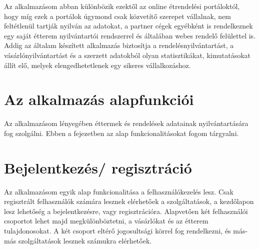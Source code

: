 Az alkalmazásom abban különbözik ezektől az online étrendelési portáloktól, hogy míg ezek a portálok úgymond csak közvetítő szerepet vállalnak, nem feltétlenül tartják nyilván az adatokat, a partner cégek egyébként is rendelkeznek egy saját étterem nyilvántartói rendszerrel és általában webes rendelő felülettel is. Addig az általam készített alkalmazás biztosítja a rendelésnyilvántartást, a vásárlónyilvántartást és a szerzett adatokból olyan statisztikákat, kimutatásokat állít elő, melyek elengedhetetlenek egy sikeres vállalkozáshoz.






\section{Az alkalmazás alapfunkciói}

Az alkalmazásom lényegében éttermek és rendelések adatainak nyilvántartására fog szolgálni. Ebben a fejezetben az alap funkcionalitásokat fogom tárgyalni.

\section{Bejelentkezés/ regisztráció}

Az alkalmazásom egyik alap funkcionalitása a felhasználókezelés lesz. Csak regisztrált felhasználók számára lesznek elérhetőek a szolgáltatások, a kezdőlapon lesz lehetőség a bejelentkezésre, vagy regisztrációra. Alapvetően két felhasználói csoportot lehet majd megkülönböztetni, a vásárlókat és az étterem tulajdonosokat. A két csoport eltérő jogosultsági körrel fog rendelkezni, és más-más szolgáltatások lesznek számukra elérhetőek.

